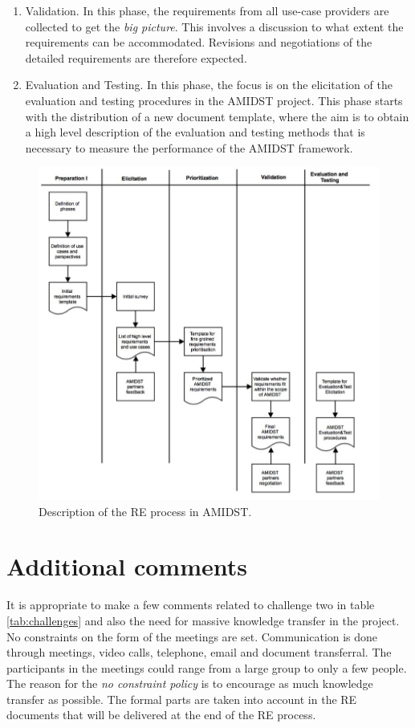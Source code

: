 \documentclass[11pt, oneside]{article}   	%
\begin{document}
\begin{enumerate}
 \item Validation. In this phase, the requirements from all use-case providers are collected to get the \emph{big picture}.  This involves a discussion to what extent the requirements can be accommodated. Revisions and negotiations of the detailed requirements are therefore expected.  
 \item Evaluation and Testing. In this phase, the focus is on the elicitation of the evaluation and testing procedures in the AMIDST project. This phase starts with the distribution of a new document template, where the aim is to obtain a high level description of the evaluation and testing methods that is necessary to measure the performance of the AMIDST framework.
\end{enumerate}

\begin{figure}
\centering
\includegraphics [keepaspectratio,width = 14cm] {REprocess1}
\caption{Description of the RE process in AMIDST.}
\label{REprocess1}
\end{figure}

\section{Additional comments}
\label{sec:retrospection}

It is appropriate to make a few comments related to challenge two in table \ref{tab:challenges} and also the need for massive knowledge transfer in the project.  No constraints on the form of the meetings are set.  Communication is done through meetings, video calls, telephone, email and document transferral.  The participants in the meetings could range from a large group to only a few people.  The reason for the \emph{no constraint policy} is to encourage as much knowledge transfer as possible.  The formal parts are taken into account in the RE documents that will be delivered at the end of the RE process. 



\end{document}
